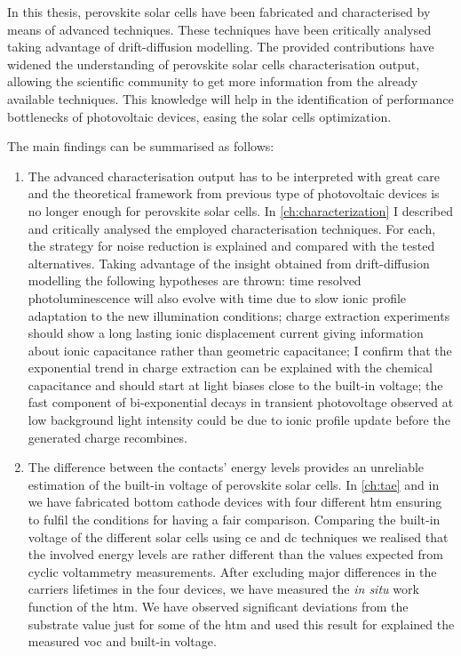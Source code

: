 
In this thesis, perovskite solar cells have been fabricated and characterised by means of advanced techniques.
These techniques have been critically analysed taking advantage of drift\hyp{}diffusion modelling.
The provided contributions have widened the understanding of perovskite solar cells characterisation output, allowing the scientific community to get more information from the already available techniques.
This knowledge will help in the identification of performance bottlenecks of photovoltaic devices, easing the solar cells optimization.

The main findings can be summarised as follows:
\begin{enumerate}
	\item The advanced characterisation output has to be interpreted with great care and the theoretical framework from previous type of photovoltaic devices is no longer enough for perovskite solar cells.
	In \cref{ch:characterization} I described and critically analysed the employed characterisation techniques.
	For each, the strategy for noise reduction is explained and compared with the tested alternatives.
	Taking advantage of the insight obtained from drift\hyp{}diffusion modelling the following hypotheses are thrown:
	time resolved photoluminescence will also evolve with time due to slow ionic profile adaptation to the new illumination conditions;
	charge extraction experiments should show a long lasting ionic displacement current giving information about ionic capacitance rather than geometric capacitance;
	I confirm that the exponential trend in charge extraction can be explained with the chemical capacitance and should start at light biases close to the built-in voltage;
	the fast component of bi\hyp{}exponential decays in transient photovoltage observed at low background light intensity could be due to ionic profile update before the generated charge recombines.
	
	\item The difference between the contacts' energy levels provides an unreliable estimation of the built-in voltage of perovskite solar cells.
	In \cref{ch:tae} and in \cite{Gelmetti2019} we have fabricated bottom cathode devices with four different \gls{htm} ensuring to fulfil the conditions for having a fair comparison.
	Comparing the built-in voltage of the different solar cells using \gls{ce} and \gls{dc} techniques we realised that the involved energy levels are rather different than the values expected from cyclic voltammetry measurements.
	After excluding major differences in the carriers lifetimes in the four devices, we have measured the \textsl{in situ} work function of the \gls{htm}.
	We have observed significant deviations from the substrate value just for some of the \gls{htm} and used this result for explained the measured \gls{voc} and built-in voltage.
		

\end{enumerate}
